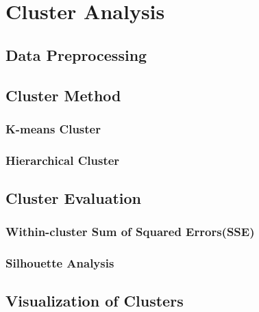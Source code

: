 
\chapter{Cluster Analysis}

% 


\section{Data Preprocessing}


\section{Cluster Method}

\subsection{K-means Cluster}

\subsection{Hierarchical Cluster}

\section{Cluster Evaluation}

\subsection{Within-cluster Sum of Squared Errors(SSE)}

\subsection{Silhouette Analysis}

\section{Visualization of Clusters}